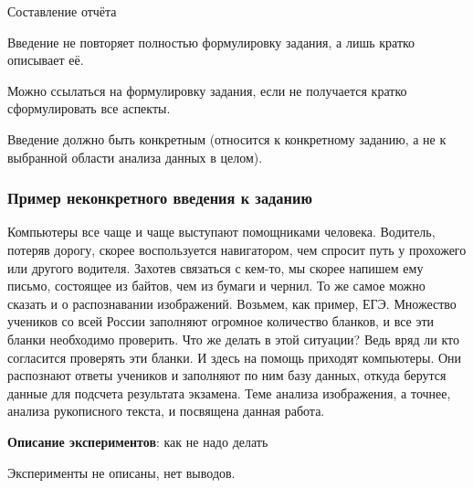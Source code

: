 \documentclass[fleqn, xcolor=x11names]{beamer}
\begin{document}
\begin{section}{Составление отчёта}
\begin{frame}[fragile]
\hfill

Введение не повторяет полностью формулировку задания, а лишь кратко описывает её.

Можно ссылаться на формулировку задания, если не получается кратко сформулировать все аспекты.

\hfill

Введение должно быть конкретным (относится к конкретному заданию, а не к выбранной области анализа данных в целом).
\end{frame}

\begin{frame}[fragile]\frametitle{Пример неконкретного введения к заданию}
Компьютеры все чаще и чаще выступают помощниками человека. Водитель, потеряв дорогу, скорее воспользуется навигатором, чем спросит путь
у прохожего или другого водителя. Захотев связаться с кем-то, мы скорее
напишем ему письмо, состоящее из байтов, чем из бумаги и чернил. То же
самое можно сказать и о распознавании изображений. Возьмем, как пример,
ЕГЭ. Множество учеников со всей России заполняют огромное количество
бланков, и все эти бланки необходимо проверить. Что же делать в этой
ситуации? Ведь вряд ли кто согласится проверять эти бланки. И здесь на
помощь приходят компьютеры. Они распознают ответы учеников и заполняют по ним базу данных, откуда берутся данные для подсчета результата экзамена. Теме анализа изображения, а точнее, анализа рукописного текста, и посвящена данная работа.
\end{frame}

\begin{frame}{\textbf{Описание экспериментов}: как не надо делать}
\begin{center}
\end{center}
Эксперименты не описаны, нет выводов.
\end{frame}


\end{section}
\end{document}
